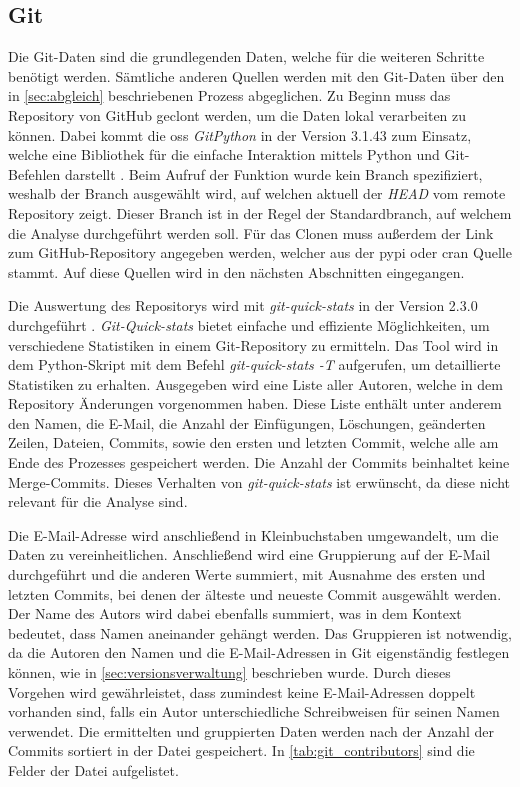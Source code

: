 \subsection{Git}
\label{subsec:datenbeschaffung_git}
Die Git-Daten sind die grundlegenden Daten, welche für die weiteren Schritte benötigt werden.
Sämtliche anderen Quellen werden mit den Git-Daten über den in \autoref{sec:abgleich} beschriebenen Prozess abgeglichen.
Zu Beginn muss das Repository von GitHub geclont werden, um die Daten lokal verarbeiten zu können.
Dabei kommt die \gls{oss} \emph{GitPython} in der Version 3.1.43 zum Einsatz, welche eine Bibliothek für die einfache Interaktion mittels Python und Git-Befehlen darstellt \autocite{thiel_gitpython_2024}.
Beim Aufruf der Funktion wurde kein Branch spezifiziert, weshalb der Branch ausgewählt wird, auf welchen aktuell der \emph{HEAD} vom remote Repository zeigt.
Dieser Branch ist in der Regel der Standardbranch, auf welchem die Analyse durchgeführt werden soll.
Für das Clonen muss außerdem der Link zum GitHub-Repository angegeben werden, welcher aus der \gls{pypi} oder \gls{cran} Quelle stammt.
Auf diese Quellen wird in den nächsten Abschnitten eingegangen.

Die Auswertung des Repositorys wird mit \emph{git-quick-stats} in der Version 2.3.0 durchgeführt \autocite{arzzen_git-quick-stats_2021}.
\emph{Git-Quick-stats} bietet einfache und effiziente Möglichkeiten, um verschiedene Statistiken in einem Git-Repository zu ermitteln.
Das Tool wird in dem Python-Skript mit dem Befehl \emph{git-quick-stats -T} aufgerufen, um detaillierte Statistiken zu erhalten.
Ausgegeben wird eine Liste aller Autoren, welche in dem Repository Änderungen vorgenommen haben.
Diese Liste enthält unter anderem den Namen, die E-Mail, die Anzahl der Einfügungen, Löschungen, geänderten Zeilen, Dateien, Commits, sowie den ersten und letzten Commit, welche alle am Ende des Prozesses gespeichert werden.
Die Anzahl der Commits beinhaltet keine Merge-Commits.
Dieses Verhalten von \emph{git-quick-stats} ist erwünscht, da diese nicht relevant für die Analyse sind.

Die E-Mail-Adresse wird anschließend in Kleinbuchstaben umgewandelt, um die Daten zu vereinheitlichen.
Anschließend wird eine Gruppierung auf der E-Mail durchgeführt und die anderen Werte summiert, mit Ausnahme des ersten und letzten Commits, bei denen der älteste und neueste Commit ausgewählt werden.
Der Name des Autors wird dabei ebenfalls summiert, was in dem Kontext bedeutet, dass Namen aneinander gehängt werden.
Das Gruppieren ist notwendig, da die Autoren den Namen und die E-Mail-Adressen in Git eigenständig festlegen können, wie in \autoref{sec:versionsverwaltung} beschrieben wurde.
Durch dieses Vorgehen wird gewährleistet, dass zumindest keine E-Mail-Adressen doppelt vorhanden sind, falls ein Autor unterschiedliche Schreibweisen für seinen Namen verwendet.
Die ermittelten und gruppierten Daten werden nach der Anzahl der Commits sortiert in der Datei  gespeichert.
In \autoref{tab:git_contributors} sind die Felder der Datei aufgelistet.

